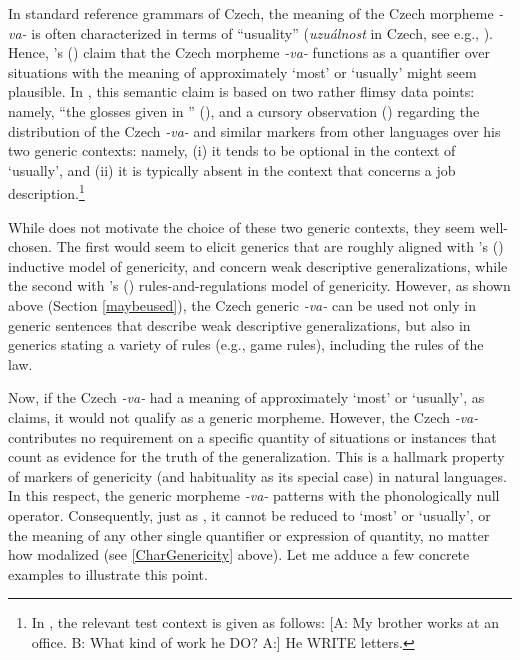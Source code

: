 \documentclass[output=paper,colorlinks,citecolor=brown]{langscibook}
\begin{document}
In standard reference grammars of Czech, the meaning
of the Czech morpheme \textit{-va-} is often characterized in terms of  ``usuality'' (\textit{uzuálnost} in Czech, see e.g., \citealt[184, i.a.]{petr1986mluvnice}). Hence, \citeauthor{dahl1995}'s (\citeyear{dahl1995}) claim that the Czech morpheme \textit{-va-} functions as a quantifier over situations with the meaning of approximately `most' or `usually' might seem plausible. In \citet{dahl1995}, this semantic claim is based on two rather flimsy data points:
namely, ``the glosses given in \citet{kucera1981aspect}'' (\citealt[421]{dahl1995}), and a cursory observation
(\citealt[420--421]{dahl1995}) regarding the distribution of the Czech \textit{-va-} and similar markers from other languages over his two generic contexts: namely, (i) it tends to be optional in the context of `usually', and (ii) it is typically absent in the context that concerns a job description.\footnote{In \citet[420--421]{dahl1995}, the relevant test context is given as follows: [A: My brother works at an office. B: What kind of work he DO? A:] He WRITE letters.}

While \citet{dahl1995} does not motivate the choice of these two generic contexts, they seem well-chosen.
The first would seem to elicit generics that  are roughly aligned with \citeauthor{carlson1995truth}'s (\citeyear{carlson1995truth}) inductive model of genericity, and concern weak descriptive generalizations,
while the second with \citeauthor{carlson1995truth}'s (\citeyear{carlson1995truth}) rules-and-regulations model of genericity.
However, as shown above (Section \ref{maybeused}), the Czech generic \textit{-va-} can be used not only in generic sentences that describe weak descriptive generalizations, but also in generics stating a variety of rules (e.g., game rules), including the rules of the law.

Now, if the Czech \textit{-va-} had a meaning of approximately `most' or `usually', as \citet{dahl1995} claims, it would not qualify as a generic morpheme.
However, the Czech \textit{-va-}
contributes no requirement on a specific quantity of situations or instances that count as evidence for the truth of the generalization. This is a hallmark property of  markers of genericity (and habituality as its special case) in natural languages.
In this respect, the generic morpheme \textit{-va-}
patterns with the phonologically null  operator. Consequently, just as , it cannot be reduced to `most' or `usually', or the meaning of any other single quantifier or expression of quantity, no matter how modalized
(see \ref{CharGenericity} above).
Let me adduce a few concrete examples to illustrate this point.
\end{document}
